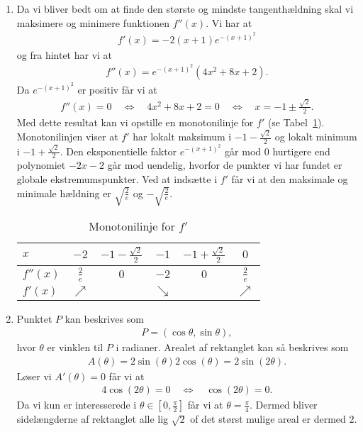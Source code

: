 \begin{enumerate}
	
	\item Da vi bliver bedt om at finde den største og mindste tangenthældning skal vi maksimere og minimere funktionen $f''(x)$. Vi har at
	\begin{align*}
	f'(x)=-2(x+1)e^{-(x+1)^2}
	\end{align*}
	og fra hintet har vi at
	\begin{align*}
	f''(x)=e^{-(x+1)^2}(4x^2+8x+2).
	\end{align*}
	Da $e^{-(x+1)^2}$ er positiv får vi at
	\begin{align*}
	f''(x)=0\quad \Leftrightarrow \quad 4x^2+8x+2=0 \quad \Leftrightarrow \quad x=-1\pm \frac{\sqrt{2}}{2}.
	\end{align*}
	Med dette resultat kan vi opstille en monotonilinje for $f'$ (se Tabel~\ref{fig:opt2}). Monotonilinjen viser at $f'$ har lokalt maksimum i $-1- \frac{\sqrt{2}}{2}$ og lokalt minimum i $-1+\frac{\sqrt{2}}{2}$. Den eksponentielle faktor $e^{-(x+1)^2}$ går mod $0$ hurtigere end polynomiet $-2x-2$ går mod uendelig, hvorfor de punkter vi har fundet er globale ekstremumspunkter. Ved at indsætte i $f'$ får vi at den maksimale og minimale hældning er $\sqrt{\frac{2}{e}}$ og $-\sqrt{\frac{2}{e}}$.
	\begin{table}[h!]
		\centering
		\begin{tabular}{@{}l  c c c c c@{}}
			$x$      & $-2$ 			 & $-1-\frac{\sqrt{2}}{2}$	& $-1$		& $-1+\frac{\sqrt{2}}{2}$	&$0$			\\ \toprule
			$f''(x)$  & $\frac{2}{e}$	 &     $0$ 		 			& $-2$		& $0$						&$\frac{2}{e}$	\\ \midrule
			$f'(x)$   & $\nearrow$&									& $\searrow$&							&$\nearrow$			\\ \bottomrule  
		\end{tabular}	
		\caption{Monotonilinje for $f'$}
		\label{fig:opt2}
\end{table}	
	
	\item Punktet $P$ kan beskrives som
	\begin{align*}
	P=(\cos \theta,\sin\theta),
	\end{align*}
	hvor $\theta$ er vinklen til $P$ i radianer. Arealet af rektanglet kan så beskrives som
	\begin{align*}
	A(\theta)=2\sin(\theta)2\cos(\theta)=2\sin(2\theta).
	\end{align*}
	Løser vi $A'(\theta)=0$ får vi at 
	\begin{align*}
	4\cos(2\theta)=0\quad\Leftrightarrow\quad \cos(2\theta)=0.
	\end{align*}
	Da vi kun er interesserede i $\theta\in [0,\frac{\pi}{2}]$ får vi at $\theta=\frac{\pi}{4}$. Dermed bliver sidelængderne af rektanglet alle lig $\sqrt{2}$ of det størst mulige areal er dermed $2$.
	

\end{enumerate}
